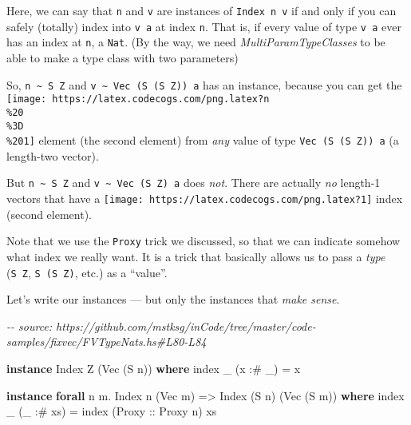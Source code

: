 \documentclass[]{article}
\newenvironment{Shaded}{}{}
\newcommand{\CommentTok}[1]{\textcolor[rgb]{0.38,0.63,0.69}{\textit{#1}}}
\newcommand{\DataTypeTok}[1]{\textcolor[rgb]{0.56,0.13,0.00}{#1}}
\newcommand{\FunctionTok}[1]{\textcolor[rgb]{0.02,0.16,0.49}{#1}}
\newcommand{\KeywordTok}[1]{\textcolor[rgb]{0.00,0.44,0.13}{\textbf{#1}}}
\newcommand{\NormalTok}[1]{#1}
\newcommand{\OperatorTok}[1]{\textcolor[rgb]{0.40,0.40,0.40}{#1}}
\newcommand{\OtherTok}[1]{\textcolor[rgb]{0.00,0.44,0.13}{#1}}
\begin{document}
Here, we can say that \texttt{n} and \texttt{v} are instances of
\texttt{Index\ n\ v} if and only if you can safely (totally) index into
\texttt{v\ a} at index \texttt{n}. That is, if every value of type \texttt{v\ a}
ever has an index at \texttt{n}, a \texttt{Nat}. (By the way, we need
\emph{MultiParamTypeClasses} to be able to make a type class with two
parameters)

So, \texttt{n\ \textasciitilde{}\ S\ Z} and
\texttt{v\ \textasciitilde{}\ Vec\ (S\ (S\ Z))\ a} has an instance, because you
can get the
\texttt{[image: https://latex.codecogs.com/png.latex?n\\\%20\\\%3D\\\%201]} element
(the second element) from \emph{any} value of type \texttt{Vec\ (S\ (S\ Z))\ a}
(a length-two vector).

But \texttt{n\ \textasciitilde{}\ S\ Z} and
\texttt{v\ \textasciitilde{}\ Vec\ (S\ Z)\ a} does \emph{not}. There are
actually \emph{no} length-1 vectors that have a
\texttt{[image: https://latex.codecogs.com/png.latex?1]} index (second element).

Note that we use the \texttt{Proxy} trick we discussed, so that we can indicate
somehow what index we really want. It is a trick that basically allows us to
pass a \emph{type} (\texttt{S\ Z}, \texttt{S\ (S\ Z)}, etc.) as a ``value''.

Let's write our instances --- but only the instances that \emph{make sense}.

\begin{Shaded}
\begin{Highlighting}[]
\CommentTok{{-}{-} source: https://github.com/mstksg/inCode/tree/master/code{-}samples/fixvec/FVTypeNats.hs\#L80{-}L84}

\KeywordTok{instance} \DataTypeTok{Index} \DataTypeTok{Z}\NormalTok{ (}\DataTypeTok{Vec}\NormalTok{ (}\DataTypeTok{S}\NormalTok{ n)) }\KeywordTok{where}
    \FunctionTok{index}\NormalTok{ \_ (x }\OperatorTok{:\#}\NormalTok{ \_) }\OtherTok{=}\NormalTok{ x}

\KeywordTok{instance} \KeywordTok{forall}\NormalTok{ n m}\OperatorTok{.} \DataTypeTok{Index}\NormalTok{ n (}\DataTypeTok{Vec}\NormalTok{ m) }\OtherTok{=>} \DataTypeTok{Index}\NormalTok{ (}\DataTypeTok{S}\NormalTok{ n) (}\DataTypeTok{Vec}\NormalTok{ (}\DataTypeTok{S}\NormalTok{ m)) }\KeywordTok{where}
    \FunctionTok{index}\NormalTok{ \_ (\_ }\OperatorTok{:\#}\NormalTok{ xs) }\OtherTok{=} \FunctionTok{index}\NormalTok{ (}\DataTypeTok{Proxy}\OtherTok{ ::} \DataTypeTok{Proxy}\NormalTok{ n) xs}
\end{Highlighting}
\end{Shaded}
\end{document}
